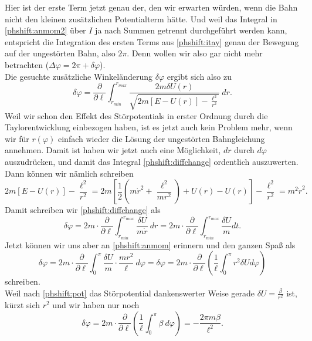 \begin{Answer}[ref = phshift]
\begin{equation}
	\end{equation}
	Hier ist der erste Term jetzt genau der, den wir erwarten würden, wenn die Bahn nicht den kleinen zusätzlichen Potentialterm hätte. Und weil das Integral in \eqref{phshift:anmom2} über $I$ ja nach Summen getrennt durchgeführt werden kann, entspricht die Integration des ersten Terms aus \eqref{phshift:itay} genau der Bewegung auf der ungestörten Bahn, also $2\pi$. Denn wollen wir also gar nicht mehr betrachten ($\Delta \varphi = 2\pi + \delta \varphi$).\\
	Die gesuchte zusätzliche Winkeländerung $\delta\varphi$ ergibt sich also zu
	\begin{equation}\label{phshift:diffchange}
		\delta \varphi =\frac{\partial}{\partial \ell} \int_{r_{min}}^{r_{max}} \frac{2m\delta U\left(r\right)}{\sqrt{2m\left[E-U\left(r\right) \right] - \frac{\ell^2}{r^2}}}~dr.
	\end{equation}
	Weil wir schon den Effekt des Störpotentials in erster Ordnung durch die Taylorentwicklung einbezogen haben, ist es jetzt auch kein Problem mehr, wenn wir für $r\left(\varphi\right)$ einfach wieder die Lösung der ungestörten Bahngleichung annehmen. Damit ist haben wir jetzt auch eine Möglichkeit, $dr$ durch $d\varphi$ auszudrücken, und damit das Integral \eqref{phshift:diffchange} ordentlich auszuwerten.\\
	Dann können wir nämlich schreiben
	\begin{equation*}
		2m\left[E-U\left(r\right) \right] - \frac{\ell^2}{r^2} = 2m \left[\frac{1}{2}\left(m\dot{r}^2 + \frac{\ell^2}{mr^2}\right) + U\left(r\right) - U\left(r\right)\right] - \frac{\ell^2}{r^2}
	=	m^2\dot{r}^2.
	\end{equation*}
	Damit schreiben wir \eqref{phshift:diffchange} als
	\begin{equation}
		\delta \varphi = 2m\cdot \frac{\partial}{\partial \ell} \int_{r_{min}}^{r_{max}} \frac{ \delta U}{m\dot{r}}~dr =  2m\cdot \frac{\partial}{\partial \ell} \int_{r_{min}}^{r_{max}} \frac{\delta U}{m}dt.
	\end{equation}
	Jetzt können wir uns aber an \eqref{phshift:anmom} erinnern und den ganzen Spaß als
	\begin{equation}\label{phshift:subs}
		\delta \varphi = 2m\cdot \frac{\partial}{\partial \ell} \int_{0}^{\pi} \frac{\delta U}{m} \cdot \frac{mr^2}{\ell} ~d\varphi = \delta \varphi = 2m\cdot \frac{\partial}{\partial \ell}\left( \frac{1}{\ell} \int_{0}^{\pi} r^2\delta U d\varphi\right)
	\end{equation}
	schreiben.\\
	Weil nach \eqref{phshift:pot} das Störpotential dankenswerter Weise gerade $\delta U = \frac{\beta}{r^2}$ ist, kürzt sich $r^2$ und wir haben nur noch
	\begin{equation}
		\boxed{\delta \varphi = 2m\cdot \frac{\partial}{\partial \ell}\left( \frac{1}{\ell} \int_{0}^{\pi} \beta ~d\varphi\right) = -\frac{2\pi m\beta}{\ell^2}. 
			}
	\end{equation}
	
	
\end{Answer}
